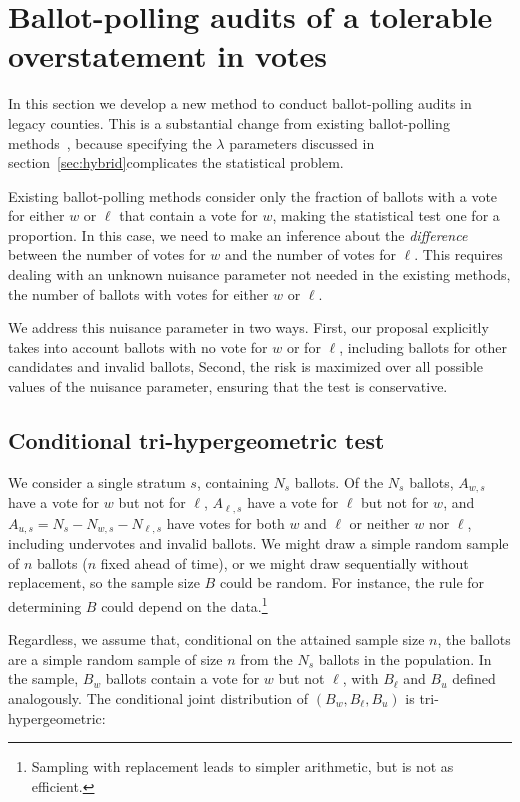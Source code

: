 \section{Ballot-polling audits of a tolerable overstatement in votes}
\label{sec:ballotPollError}

In this section we develop a new method to conduct ballot-polling audits in legacy counties.  
This is a substantial change from existing ballot-polling methods~\cite{lindemanEtal12}, because specifying the $\lambda$ parameters discussed in section~\ref{sec:hybrid}complicates the statistical problem.

Existing ballot-polling methods consider only the fraction of ballots with a vote for either 
$w$ or $\ell$ that contain a vote for $w$,
making the statistical test one for a proportion.
In this case, we need to make an inference about the 
\emph{difference} between the number of votes for $w$ and the number of votes for $\ell$.
This requires dealing with an unknown nuisance parameter not needed in the existing methods, the number of ballots with votes for either $w$ or $\ell$.

We address this nuisance parameter in two ways.
First, our proposal explicitly takes into account ballots with no vote for $w$ or for $\ell$, including ballots for other candidates and invalid ballots,
Second, the risk is maximized over all possible values of the nuisance parameter,
ensuring that the test is conservative.

\subsection{Conditional tri-hypergeometric test}

We consider a single stratum $s$, containing $N_s$ ballots.
Of the $N_s$ ballots,
$A_{w,s}$ have a vote for $w$ but not for $\ell$, $A_{\ell,s}$ have a vote for $\ell$ but not for $w$, and $A_{u,s} = N_s - N_{w,s} - N_{\ell,s}$ have votes for both $w$ and $\ell$ or neither $w$ nor $\ell$, including undervotes and invalid ballots.
We might draw a simple random sample of $n$ ballots ($n$ fixed ahead of time), or we might draw 
sequentially without replacement, so the sample size $B$ could be random.
For instance, the rule for determining $B$ could depend on the data.\footnote{%
   Sampling with replacement leads to simpler arithmetic, but is not as efficient.
}

Regardless, we assume that, conditional on the attained sample size $n$, the ballots are a simple random sample of size $n$ from the $N_s$ ballots in the population.
In the sample, $B_w$ ballots contain a vote for $w$ but not $\ell$, with $B_\ell$ and $B_u$ defined analogously.
The conditional joint distribution of
$(B_w, B_\ell, B_u)$ is tri-hypergeometric: 

